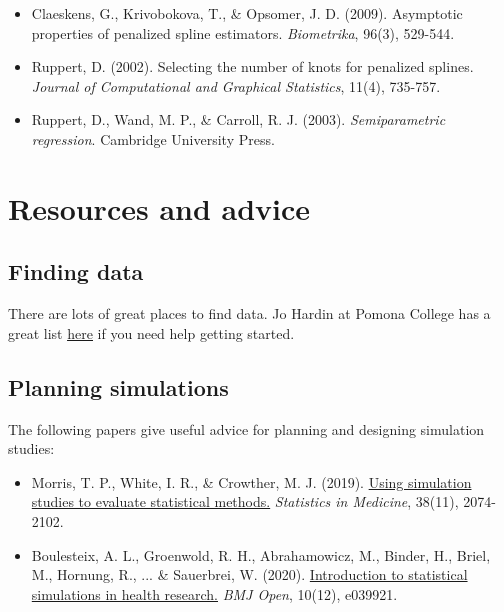 \documentclass[11pt]{article}
\begin{document}
\begin{itemize}
\begin{itemize}
\item Claeskens, G., Krivobokova, T., \& Opsomer, J. D. (2009). Asymptotic properties of penalized spline estimators. \textit{Biometrika}, 96(3), 529-544.

\item Ruppert, D. (2002). Selecting the number of knots for penalized splines. \textit{Journal of Computational and Graphical Statistics}, 11(4), 735-757.

\item Ruppert, D., Wand, M. P., \& Carroll, R. J. (2003). \textit{Semiparametric regression}. Cambridge University Press.
\end{itemize}
\end{itemize}

\section*{Resources and advice}

\subsection*{Finding data}

There are lots of great places to find data. Jo Hardin at Pomona College has a great list \href{https://hardin47.netlify.app/courses/data/}{\underline{here}} if you need help getting started.

\subsection*{Planning simulations}

The following papers give useful advice for planning and designing simulation studies:

\begin{itemize}
\item Morris, T. P., White, I. R., \& Crowther, M. J. (2019). \href{https://onlinelibrary.wiley.com/doi/10.1002/sim.8086}{Using simulation studies to evaluate statistical methods.} \textit{Statistics in Medicine}, 38(11), 2074-2102.

\item Boulesteix, A. L., Groenwold, R. H., Abrahamowicz, M., Binder, H., Briel, M., Hornung, R., ... \& Sauerbrei, W. (2020). \href{https://bmjopen.bmj.com/content/10/12/e039921}{Introduction to statistical simulations in health research.} \textit{BMJ Open}, 10(12), e039921.
\end{itemize}
\end{document}
